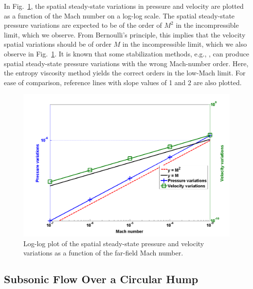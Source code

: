 \documentclass[review,10pt]{elsarticle}
\newcommand{\fig}[1]{Fig.~\ref{#1}}                      %
\begin{document}
%
In \fig{fig:pressure_vel_fluc}, the spatial steady-state variations in pressure and velocity are plotted as a function of the 
Mach number on a log-log scale. The spatial steady-state pressure variations are expected to be of the order of $M^2$ in the incompressible limit, 
which we observe. From Bernoulli's principle, this implies that the velocity spatial variations should be of order $M$ 
in the incompressible limit, which we also observe in \fig{fig:pressure_vel_fluc}. 
It is known that some stabilization methods, e.g., \cite{LowMach1, LowMach2, LowMach3}, 
can produce spatial steady-state pressure variations with the wrong Mach-number order. Here, the entropy viscosity method yields 
the correct orders in the low-Mach limit. For ease of comparison, reference lines with slope values of 1 and 2 are also plotted.
%
\begin{figure}[H]
\centering
\includegraphics[width=\textwidth]{figures/pressure_fluctuation.png}
\caption{Log-log plot of the spatial steady-state pressure and velocity variations as a function of the far-field Mach number.}
\label{fig:pressure_vel_fluc}
\end{figure}

\subsection{Subsonic Flow Over a Circular Hump} \label{sec:hump}
\end{document}
